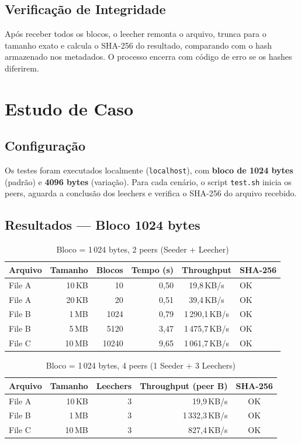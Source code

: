 \documentclass[12pt,a4paper]{article}
\begin{document}
\subsection{Verificação de Integridade}

Após receber todos os blocos, o leecher remonta o arquivo,
trunca para o tamanho exato e calcula o SHA-256 do resultado,
comparando com o hash armazenado nos metadados.
O processo encerra com código de erro se os hashes diferirem.

\section{Estudo de Caso}

\subsection{Configuração}

Os testes foram executados localmente (\texttt{localhost}),
com \textbf{bloco de 1024 bytes} (padrão) e \textbf{4096 bytes} (variação).
Para cada cenário, o script \texttt{test.sh} inicia os peers, aguarda
a conclusão dos leechers e verifica o SHA-256 do arquivo recebido.

\subsection{Resultados --- Bloco 1024 bytes}

\begin{table}[H]
\centering
\caption{Bloco = 1\,024 bytes, 2 peers (Seeder + Leecher)}
\label{tab:1024_2p}
\begin{tabular}{lrrrc}
\toprule
Arquivo & Tamanho & Blocos & Tempo (s) & Throughput & SHA-256 \\
\midrule
File A & 10\,KB  &    10 & 0,50 &  19,8\,KB/s  & OK \\
File A & 20\,KB  &    20 & 0,51 &  39,4\,KB/s  & OK \\
File B &  1\,MB  &  1024 & 0,79 &   1\,290,1\,KB/s & OK \\
File B &  5\,MB  &  5120 & 3,47 &   1\,475,7\,KB/s & OK \\
File C & 10\,MB  & 10240 & 9,65 &   1\,061,7\,KB/s & OK \\
\bottomrule
\end{tabular}
\end{table}

\begin{table}[H]
\centering
\caption{Bloco = 1\,024 bytes, 4 peers (1 Seeder + 3 Leechers)}
\label{tab:1024_4p}
\begin{tabular}{lrrrc}
\toprule
Arquivo & Tamanho & Leechers & Throughput (peer B) & SHA-256 \\
\midrule
File A & 10\,KB & 3 &  19,9\,KB/s & OK \\
File B &  1\,MB & 3 &  1\,332,3\,KB/s & OK \\
File C & 10\,MB & 3 &   827,4\,KB/s & OK \\
\bottomrule
\end{tabular}
\end{table}
\end{document}
